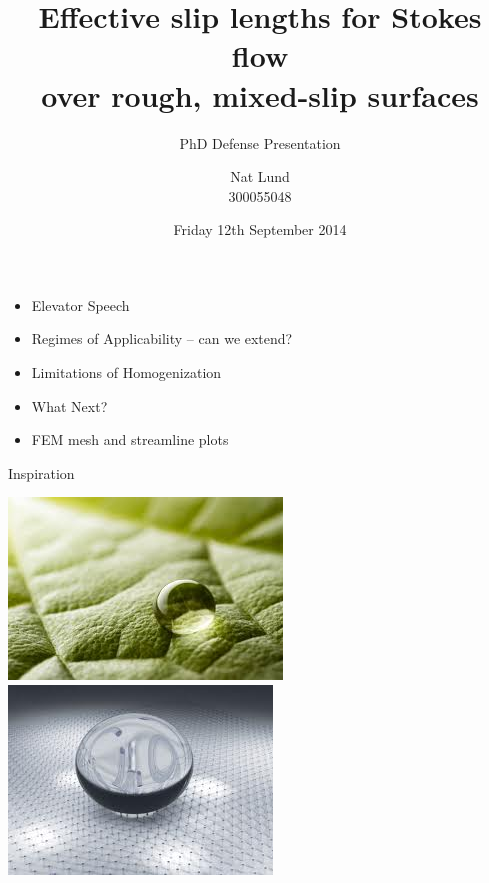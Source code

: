 \documentclass{beamer}
\title{Effective slip lengths for Stokes flow \\ over rough, mixed-slip surfaces}
\subtitle{\color{red}PhD Defense Presentation}
\author{Nat Lund \\ 300055048}
\institute{Victoria University of Wellington}
\date{Friday 12th September 2014}
\begin{document}
\begin{frame}
\maketitle
\end{frame}


\begin{frame}
\begin{itemize}
\item Elevator Speech
\item Regimes of Applicability -- can we extend?
\item Limitations of Homogenization
\item What Next?
\item FEM mesh and streamline plots
\end{itemize}

\end{frame}


\begin{frame}{Inspiration}

\begin{center}
\includegraphics[scale=0.52]{lotus-leaf.jpg}
\phantom{gap}
\includegraphics[scale=0.5]{superhydrophobic.jpg}
\end{center}

\end{frame}
\end{document}

